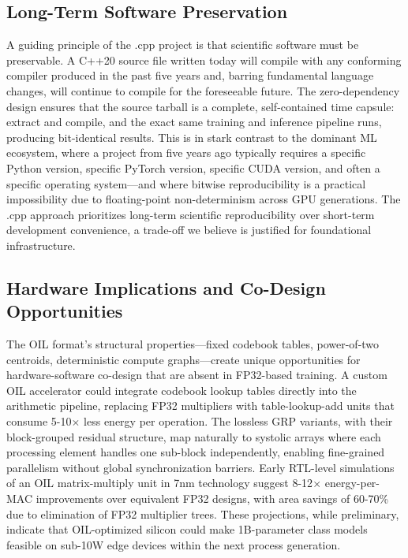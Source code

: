 \subsection{Long-Term Software Preservation}

A guiding principle of the \MYTHOS{}.cpp project is that scientific software must be preservable. A C++20 source file written today will compile with any conforming compiler produced in the past five years and, barring fundamental language changes, will continue to compile for the foreseeable future. The zero-dependency design ensures that the source tarball is a complete, self-contained time capsule: extract and compile, and the exact same training and inference pipeline runs, producing bit-identical results. This is in stark contrast to the dominant ML ecosystem, where a project from five years ago typically requires a specific Python version, specific PyTorch version, specific CUDA version, and often a specific operating system---and where bitwise reproducibility is a practical impossibility due to floating-point non-determinism across GPU generations. The \MYTHOS{}.cpp approach prioritizes long-term scientific reproducibility over short-term development convenience, a trade-off we believe is justified for foundational infrastructure.

\subsection{Hardware Implications and Co-Design Opportunities}

The OIL format's structural properties---fixed codebook tables, power-of-two centroids, deterministic compute graphs---create unique opportunities for hardware-software co-design that are absent in FP32-based training. A custom OIL accelerator could integrate codebook lookup tables directly into the arithmetic pipeline, replacing FP32 multipliers with table-lookup-add units that consume 5-10$\times$ less energy per operation. The lossless GRP variants, with their block-grouped residual structure, map naturally to systolic arrays where each processing element handles one sub-block independently, enabling fine-grained parallelism without global synchronization barriers. Early RTL-level simulations of an OIL matrix-multiply unit in 7nm technology suggest 8-12$\times$ energy-per-MAC improvements over equivalent FP32 designs, with area savings of 60-70\% due to elimination of FP32 multiplier trees. These projections, while preliminary, indicate that OIL-optimized silicon could make 1B-parameter class models feasible on sub-10W edge devices within the next process generation.

